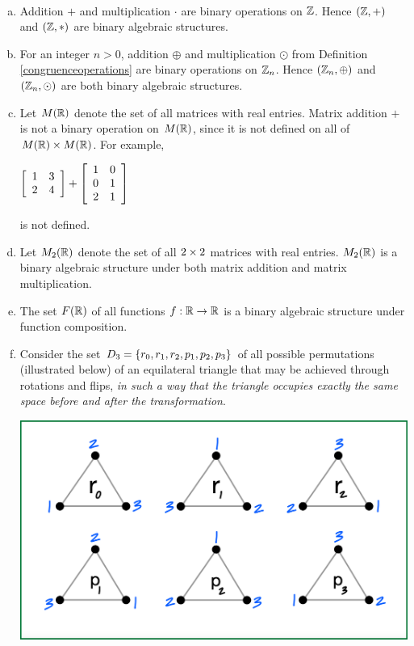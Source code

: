 \documentclass[11pt,fleqn,dvipsnames,usenames]{article}
\begin{document}
\begin{examples}\label{basexamples}~

\begin{enumerate}[(a)]
\item Addition $+$ and multiplication $\cdot$ are binary operations on $\Z$.  Hence $(\Z,+)$ and $(\Z,*)$ are binary algebraic structures.
\item For an integer $n > 0$, addition $\oplus$ and multiplication $\odot$ from Definition \ref{congruenceoperations} are binary operations on $\ZN$.  Hence $(\ZN,\oplus)$ and $(\Z_{n},\odot)$ are both binary algebraic structures.
\item Let $M(\REAL)$ denote the set of all matrices with real entries.  Matrix addition $+$ is not a binary operation on $M(\REAL)$, since it is not defined on all of $M(\REAL)\times M(\REAL)$.  For example,
\begin{center}
$\MATRIX{rr}{1 & 3\\2 & 4} + \MATRIX{rr}{1 & 0\\0 & 1\\2 & 1}$
\end{center}
is not defined.
\item Let $M_{2}(\REAL)$ denote the set of all $2\BY 2$ matrices with real entries.  $M_{2}(\REAL)$ is a binary algebraic structure under both matrix addition and matrix multiplication.
\item The set $F(\REAL)$ of all functions $f:\REAL\to\REAL$ is a binary algebraic structure under function composition.
\item \label{dihedralgroup} Consider the set $D_3 = \SET{r_0,r_1,r_2,p_1,p_2,p_3}$ of all possible permutations (illustrated below) of an equilateral triangle that may be achieved through rotations and flips, \emph{in such a way that the triangle occupies exactly the same space before and after the transformation}.

\begin{center}
\includegraphics[width=0.5\linewidth]{permutationsoftriangle}
\end{center}


\end{enumerate}
\end{examples}
\end{document}
